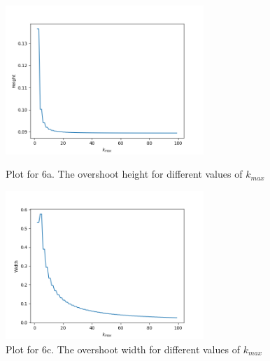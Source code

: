 \begin{figure}[H]
	\centering
	\begin{minipage}[c]{7.5cm}
		\includegraphics[width=7.5cm]{img/ex_6_a.png}
		\captionsetup{width=6cm}
		\caption{Plot for 6a. The overshoot height for different values of $k_{max}$}
	\end{minipage}
	\begin{minipage}[c]{7.5cm}
		\includegraphics[width=7.5cm]{img/ex_6_b.png}
		\captionsetup{width=6cm}
		\caption{Plot for 6c. The overshoot width for different values of $k_{max}$}
	\end{minipage}
\end{figure}





